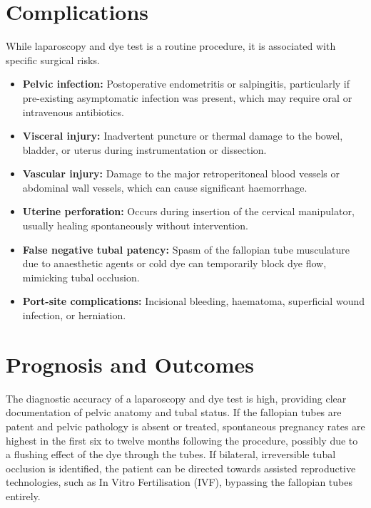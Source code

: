 \section*{Complications}
While laparoscopy and dye test is a routine procedure, it is associated with specific surgical risks.
\begin{itemize}
    \item \textbf{Pelvic infection:} Postoperative endometritis or salpingitis, particularly if pre-existing asymptomatic infection was present, which may require oral or intravenous antibiotics.
    \item \textbf{Visceral injury:} Inadvertent puncture or thermal damage to the bowel, bladder, or uterus during instrumentation or dissection.
    \item \textbf{Vascular injury:} Damage to the major retroperitoneal blood vessels or abdominal wall vessels, which can cause significant haemorrhage.
    \item \textbf{Uterine perforation:} Occurs during insertion of the cervical manipulator, usually healing spontaneously without intervention.
    \item \textbf{False negative tubal patency:} Spasm of the fallopian tube musculature due to anaesthetic agents or cold dye can temporarily block dye flow, mimicking tubal occlusion.
    \item \textbf{Port-site complications:} Incisional bleeding, haematoma, superficial wound infection, or herniation.
\end{itemize}

\section*{Prognosis and Outcomes}
The diagnostic accuracy of a laparoscopy and dye test is high, providing clear documentation of pelvic anatomy and tubal status. If the fallopian tubes are patent and pelvic pathology is absent or treated, spontaneous pregnancy rates are highest in the first six to twelve months following the procedure, possibly due to a flushing effect of the dye through the tubes. If bilateral, irreversible tubal occlusion is identified, the patient can be directed towards assisted reproductive technologies, such as In Vitro Fertilisation (IVF), bypassing the fallopian tubes entirely.

